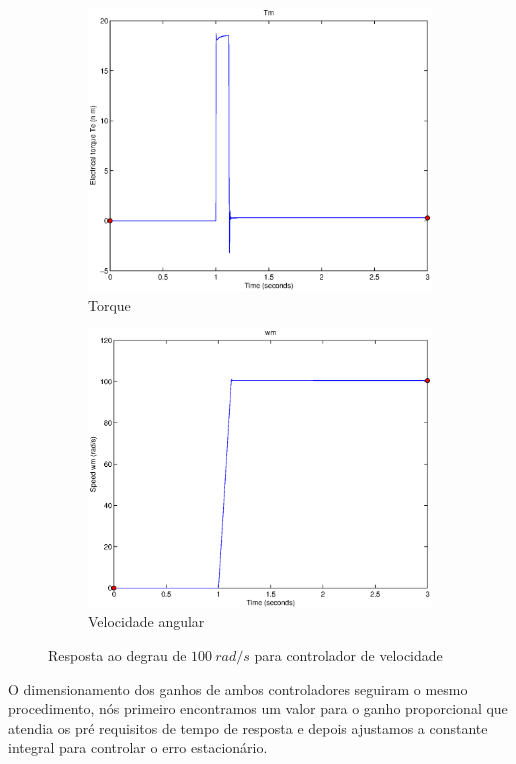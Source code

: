 \documentclass{article}
\begin{document}
\begin{figure}[H]
\begin{subfigure}{0.45\textwidth}
		\includegraphics[width=\linewidth]{matlab/tm3}
		\caption{Torque}
	\end{subfigure}
	\begin{subfigure}{0.45\textwidth}
		\includegraphics[width=\linewidth]{matlab/wm3}
		\caption{Velocidade angular}
	\end{subfigure}
	\caption{Resposta ao degrau de $100\ rad/s$ para controlador de velocidade}	
	\label{fig:sim3viwt}
\end{figure}

O dimensionamento dos ganhos de ambos controladores seguiram o mesmo procedimento, nós primeiro encontramos um valor para o ganho proporcional que atendia os pré requisitos de tempo de resposta e depois ajustamos a constante integral para controlar o erro estacionário.
\end{document}
